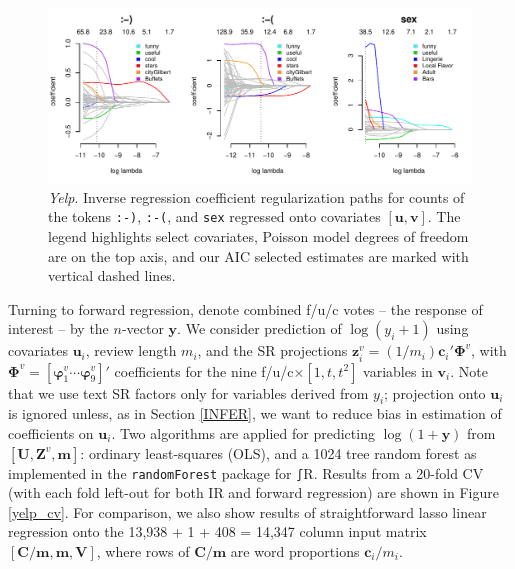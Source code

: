 \documentclass[12pt]{article}
\newcommand{\bs}[1]{\boldsymbol{#1}}
\newcommand{\bm}[1]{\mathbf{#1}}
\newcommand{\cd}[1]{{\tt#1}}
\begin{document}
\begin{figure}
\hspace{-.25in}\includegraphics[width=6.75in]{../graphs/yelp_ir_paths}
\caption{\label{yelp_ir} {\it Yelp}.  Inverse regression coefficient
regularization paths for counts of the tokens \cd{:-)}, \cd{:-(}, and \cd{sex}
regressed onto covariates $[\bm{u},\bm{v}]$.  The legend highlights select
covariates, Poisson model degrees of freedom are on the top axis, and our AIC
selected estimates are marked with vertical dashed lines. }
\end{figure}

Turning to forward regression, denote combined f/u/c votes -- the response of
interest -- by the $n$-vector $\bm{y}$. We consider prediction of
$\log(y_i+1)$ using covariates $\bm{u}_i$, review length $m_i$, and the SR
projections $\bm{z}_i^v = (1/m_i)\bm{c}_i'\bs{\Phi}^v$, with $\bs{\Phi}^v =
[\bs{\varphi}^v_1 \cdots \bs{\varphi}^v_9]'$  coefficients for the nine
f/u/c$\times [1,t,t^2]$ variables in $\bm{v}_i$.  Note that we use text SR
factors only for variables derived from $y_i$; projection onto $\bm{u}_i$ is
ignored unless, as in Section \ref{INFER}, we want to reduce bias in estimation of
coefficients on  $\bm{u}_i$. Two algorithms are applied for predicting
$\log(1+\bm{y})$ from $[\bm{U},\bm{Z}^v,\bm{m}]$: ordinary least-squares (OLS), and
a 1024 tree random forest \citep[RF;][]{breiman_random_2001} as implemented in the
\cd{randomForest} package for \cd∫{R}. Results from a 20-fold CV (with each fold left-out for both IR and forward regression)
are shown in Figure \ref{yelp_cv}.  For comparison, we also
show results of straightforward lasso linear regression onto the 13,938 + 1 +
408 =  14,347 column input matrix $[\bm{C}/\bm{m},\bm{m},\bm{V}]$, where
rows of $\bm{C}/\bm{m}$ are word proportions $\bm{c}_i/m_i$.
\end{document}
